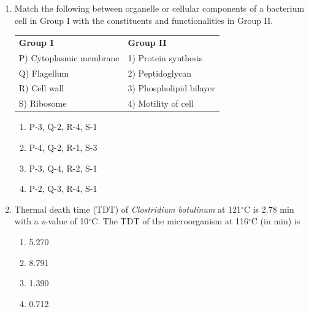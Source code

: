 \documentclass[journal,12pt,onecolumn]{IEEEtran}
\begin{document}
\begin{enumerate}[label=\arabic*.]
\item Match the following between organelle or cellular components of a bacterium cell in Group I with the constituents and functionalities in Group II.
\begin{center}
\begin{tabular}{p{6cm} p{6cm}}
\textbf{Group I} & \textbf{Group II} \\
P) Cytoplasmic membrane & 1) Protein synthesis \\
Q) Flagellum & 2) Peptidoglycan \\
R) Cell wall & 3) Phospholipid bilayer \\
S) Ribosome & 4) Motility of cell \\
\end{tabular}
\end{center}
\begin{multicols}{2}
\begin{enumerate}[label=(\Alph*)]
\item P-3, Q-2, R-4, S-1
\item P-4, Q-2, R-1, S-3
\item P-3, Q-4, R-2, S-1
\item P-2, Q-3, R-4, S-1
\end{enumerate}
\end{multicols}

\item Thermal death time (TDT) of \textit{Clostridium botulinum} at 121$^\circ$C is 2.78 min with a z-value of 10$^\circ$C. The TDT of the microorganism at 116$^\circ$C (in min) is
\begin{multicols}{4}
\begin{enumerate}[label=(\Alph*)]
\item 5.270
\item 8.791
\item 1.390
\item 0.712
\end{enumerate}
\end{multicols}


\end{enumerate}
\end{document}
